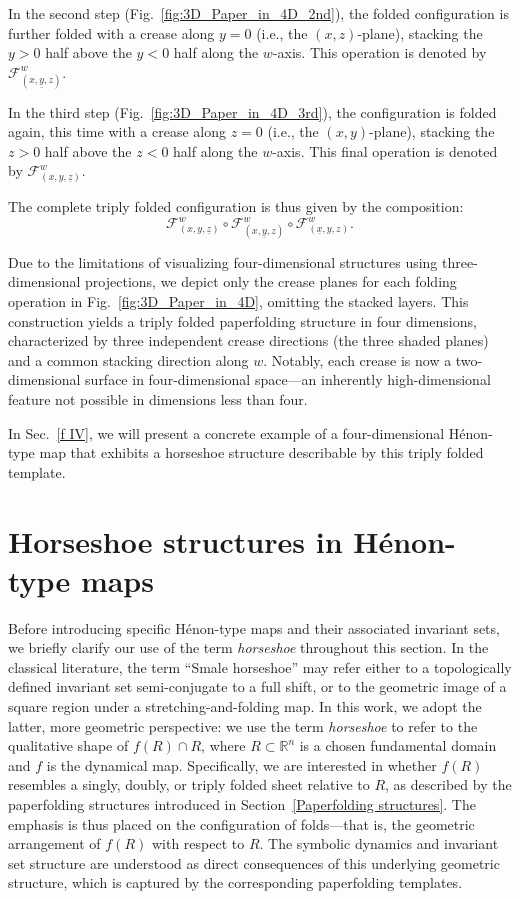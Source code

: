 \documentclass[12pt]{iopart}
\begin{document}
In the second step (Fig.~\ref{fig:3D_Paper_in_4D_2nd}), the folded configuration is further folded with a crease along \(y = 0\) (i.e., the \((x,z)\)-plane), stacking the \(y > 0\) half above the \(y < 0\) half along the \(w\)-axis. This operation is denoted by \( \mathcal{F}^w_{(x,\underline{y},z)} \).

In the third step (Fig.~\ref{fig:3D_Paper_in_4D_3rd}), the configuration is folded again, this time with a crease along \(z = 0\) (i.e., the \((x,y)\)-plane), stacking the \(z > 0\) half above the \(z < 0\) half along the \(w\)-axis. This final operation is denoted by \( \mathcal{F}^w_{(x,y,\underline{z})} \).

The complete triply folded configuration is thus given by the composition:
\[
\mathcal{F}^w_{(x,y,\underline{z})} \circ \mathcal{F}^w_{(x,\underline{y},z)} \circ \mathcal{F}^w_{(\underline{x},y,z)}.
\]

Due to the limitations of visualizing four-dimensional structures using three-dimensional projections, we depict only the crease planes for each folding operation in Fig.~\ref{fig:3D_Paper_in_4D}, omitting the stacked layers. This construction yields a triply folded paperfolding structure in four dimensions, characterized by three independent crease directions (the three shaded planes) and a common stacking direction along \(w\). Notably, each crease is now a two-dimensional surface in four-dimensional space—an inherently high-dimensional feature not possible in dimensions less than four.

In Sec.~\ref{f IV}, we will present a concrete example of a four-dimensional Hénon-type map that exhibits a horseshoe structure describable by this triply folded template.



\section{Horseshoe structures in H\'{e}non-type maps}
\label{Horseshoe structures in Henon-type maps}

Before introducing specific Hénon-type maps and their associated invariant sets, we briefly clarify our use of the term \emph{horseshoe} throughout this section. In the classical literature, the term “Smale horseshoe” may refer either to a topologically defined invariant set semi-conjugate to a full shift, or to the geometric image of a square region under a stretching-and-folding map. In this work, we adopt the latter, more geometric perspective: we use the term \emph{horseshoe} to refer to the qualitative shape of \( f(R) \cap R \), where \( R \subset \mathbb{R}^n \) is a chosen fundamental domain and \( f \) is the dynamical map. Specifically, we are interested in whether \( f(R) \) resembles a singly, doubly, or triply folded sheet relative to \( R \), as described by the paperfolding structures introduced in Section~\ref{Paperfolding structures}. The emphasis is thus placed on the configuration of folds—that is, the geometric arrangement of \( f(R) \) with respect to \( R \). The symbolic dynamics and invariant set structure are understood as direct consequences of this underlying geometric structure, which is captured by the corresponding paperfolding templates.
\end{document}
